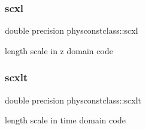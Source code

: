 \subsubsection{\texorpdfstring{scxl}{scxl}}
{\footnotesize\ttfamily double precision physconstclass\+::scxl}



length scale in z domain code 

\mbox{\label{namespacephysconstclass_a32381ca7ccc85dd961e4540f5e6c44fd}} 
\subsubsection{\texorpdfstring{scxlt}{scxlt}}
{\footnotesize\ttfamily double precision physconstclass\+::scxlt}



length scale in time domain code 


